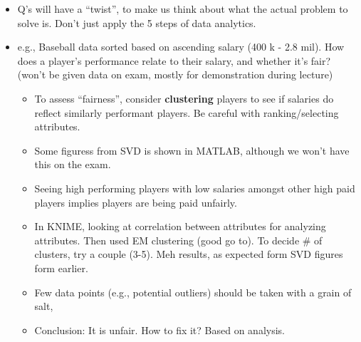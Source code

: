 \begin{itemize}
  \item Q's will have a ``twist'', to make us think about what the actual problem to solve is. Don't just apply the 5 steps of data analytics.
  \item e.g., Baseball data sorted based on ascending salary (400 k - 2.8 mil). How does a player's performance relate to their salary, and whether it's fair? (won't be given data on exam, mostly for demonstration during lecture)
        \begin{itemize}
          \item To assess ``fairness'', consider \textbf{clustering} players to see if salaries do reflect similarly performant players. Be careful with ranking/selecting attributes.
          \item Some figuress from SVD is shown in MATLAB, although we won't have this on the exam.
          \item Seeing high performing players with low salaries amongst other high paid players implies players are being paid unfairly.
          \item In KNIME, looking at correlation between attributes for analyzing attributes. Then used EM clustering (good go to). To decide \# of clusters, try a couple (3-5). Meh results, as expected form SVD figures form earlier.
          \item Few data points (e.g., potential outliers) should be taken with a grain of salt,
          \item Conclusion: It is unfair. How to fix it? Based on analysis.
        \end{itemize}
\end{itemize}
